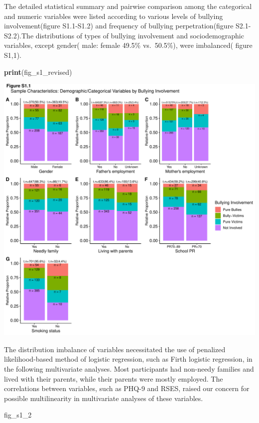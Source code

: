 \documentclass[
]{article}
\newenvironment{Shaded}{\begin{snugshade}}{\end{snugshade}}
\newcommand{\DecValTok}[1]{\textcolor[rgb]{0.00,0.00,0.81}{#1}}
\newcommand{\KeywordTok}[1]{\textcolor[rgb]{0.13,0.29,0.53}{\textbf{#1}}}
\newcommand{\NormalTok}[1]{#1}
\begin{document}
The detailed statistical summary and pairwise comparison among the
categorical and numeric variables were listed according to various
levels of bullying involvement(figure S1.1-S1.2) and frequency of
bullying perpetration(figure S2.1-S2.2).The distributions of types of
bullying involvement and sociodemographic variables, except gender(
male: female 49.5\% vs.~50.5\%), were imbalanced( figure S1,1).

\begin{Shaded}
\begin{Highlighting}[]
\KeywordTok{print}\NormalTok{(fig_s1_revised) }
\end{Highlighting}
\end{Shaded}

\includegraphics{Manuscript_files/figure-latex/unnamed-chunk-1-1.pdf}

The distribution imbalance of variables necessitated the use of
penalized likelihood-based method of logistic regression, such as Firth
logistic regression, in the following multivariate analyses. Most
participants had non-needy families and lived with their parents, while
their parents were mostly employed. The correlations between variables,
such as PHQ-9 and RSES, raised our concern for possible multilinearity
in multivariate analyses of these variables.

\begin{Shaded}
\begin{Highlighting}[]
\NormalTok{fig_s1_}\DecValTok{2}
\end{Highlighting}
\end{Shaded}
\end{document}
